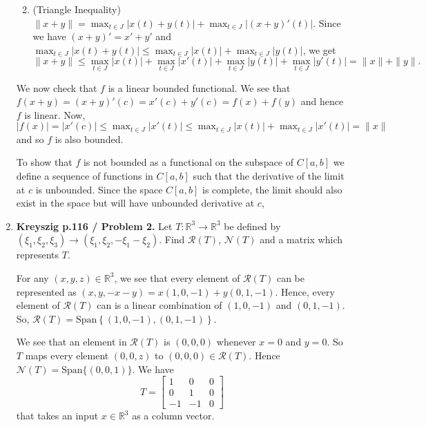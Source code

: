\documentclass[12pt]{article}
\newcommand{\rl}{\mathbb{R}}
\newcommand{\cR}{\mathcal{R}}
\newcommand{\cN}{\mathcal{N}}
\begin{document}
\begin{enumerate}
\begin{mybox}
\begin{enumerate}
            \vspace*{2mm}
        \item (Triangle Inequality)
            $\|x+y\|=\max_{t\in J}|x(t)+y(t)|
            +\max_{t\in J}|(x+y)'(t)|$. Since we have
            $(x+y)'=x'+y'$ and $\max_{t\in J}|x(t)+y(t)|
            \leq \max_{t\in J}|x(t)|+\max_{t\in J}|y(t)|$,
            we get
            $$\|x+y\|\leq \max_{t\in J}|x(t)|
            +\max_{t\in J}|x'(t)|+ \max_{t\in J}|y(t)|
            +\max_{t\in J}|y'(t)|
            =\|x\|+\|y\|.$$
    \end{enumerate}

    We now check that $f$ is a linear bounded functional.
    We see that $f(x+y)=(x+y)'(c)=x'(c)+y'(c)=f(x)+f(y)$
    and hence $f$ is linear. Now,
    $|f(x)|=|x'(c)|\leq\max_{t\in J}|x'(t)|\leq
    \max_{t\in J}|x(t)|+\max_{t\in J}|x'(t)|
            =\|x\|$ and so $f$ is also bounded.

    \vspace*{3mm}
    To show that $f$ is not bounded as a functional on the
    subspace of $C[a,b]$ we define a sequence of functions
    in $C[a,b]$ such that the derivative of the limit at
    $c$ is unbounded. Since the space $C[a,b]$ is complete,
    the limit should also exist in the space but will have
    unbounded derivative at $c$,
\end{mybox}


\item \textbf{Kreyszig p.116 / Problem 2.}
    Let $T: \rl^3\to\rl^3$ be defined by
    $(\xi_1,\xi_2,\xi_3)\to(\xi_1,\xi_2,-\xi_1-\xi_2)$.
    Find $\cR(T)$, $\cN(T)$ and a matrix which represents
    $T$.
\begin{mybox}

    For any $(x,y,z)\in\rl^3$, we see that every element of
    $\cR(T)$ can be represented as $(x,y,-x-y)=
    x(1,0,-1)+y(0,1,-1)$. Hence, every element of $\cR(T)$
    can is a linear combination of $(1,0,-1)$ and $(0,1,-1)$.
    So, $\cR(T)=\text{Span}\left\{(1,0,-1),(0,1,-1)\right\}$.
    
    \vspace*{2mm}
    We see that an element in $\cR(T)$ is $(0,0,0)$ whenever
    $x=0$ and $y=0$. So $T$ maps every element $(0,0,z)$ to
    $(0,0,0)\in \cR(T)$. Hence $\cN(T)=\text{Span}\{
    (0,0,1)\}$.
    We have
    $$T=\left[\begin{array}{ccc}
        1   &0  &0\\
        0   &1  &0\\
        -1  &-1 &0
    \end{array}\right]$$
    that takes an input $x\in\rl^3$ as a column vector.
\end{mybox}


\end{enumerate}
\end{document}
